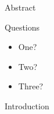 \documentclass[blue, headsep]{subdocuments/open_science_poster}\usepackage{graphicx, color}
\begin{document}
%







%

\begin{frame}[t]
	\begin{columns}[t] 
		\begin{column}{0.28\paperwidth} 

			\begin{alertblock}{Abstract}
				\lipsum[1]
			\end{alertblock}

			\begin{alertblock}{Questions}
				\begin{itemize}
					\item One?
					\item Two?
					\item Three?
				\end{itemize}
			\end{alertblock}

			\begin{block}{Introduction}
				\lipsum[1-2]	
			\end{block}


\end{column}
\end{columns}
\end{frame}
\end{document}

